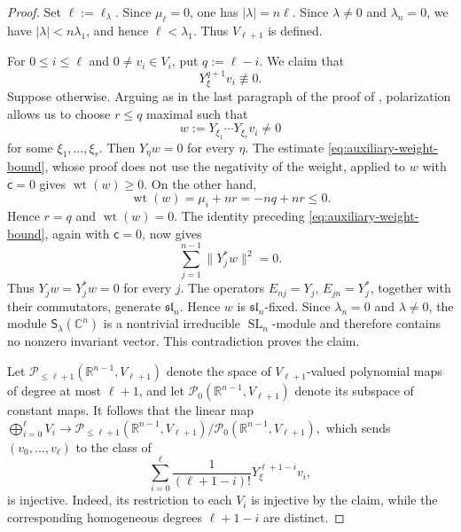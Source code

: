 \documentclass[reqno,11pt]{amsart}
\numberwithin{equation}{section}
\theoremstyle{definition}
\theoremstyle{remark}
\newcommand{\op}{\operatorname}
\newcommand{\SL}{\op{SL}}
\begin{document}
\begin{proof}
Set $\ell:=\ell_\lambda$. Since $\mu_\ell=0$, one has
$|\lambda|=n\ell$. Since $\lambda\ne0$ and $\lambda_n=0$, we have
$|\lambda|<n\lambda_1$, and hence $\ell<\lambda_1$. Thus
$V_{\ell+1}$ is defined.

For $0\le i\le\ell$ and $0\ne v_i\in V_i$, put $q:=\ell-i$. We claim that
$$
Y_\xi^{q+1}v_i\not\equiv0.
$$
Suppose otherwise. Arguing as in the last paragraph of the proof of
, polarization allows us to choose $r\le q$
maximal such that
$$
w:=Y_{\xi_1}\cdots Y_{\xi_r}v_i\ne0
$$
for some $\xi_1,\ldots,\xi_r$. Then $Y_\eta w=0$ for every $\eta$.
The estimate \eqref{eq:auxiliary-weight-bound}, whose proof does not use
the negativity of the weight, applied to $w$ with $\mathsf c=0$ gives
$\operatorname{wt}(w)\ge0$. On the other hand,
$$
\operatorname{wt}(w)
=
\mu_i+nr
=
-nq+nr
\le0.
$$
Hence $r=q$ and $\operatorname{wt}(w)=0$. The identity preceding
\eqref{eq:auxiliary-weight-bound}, again with $\mathsf c=0$, now gives
$$
\sum_{j=1}^{n-1}\|Y_j^*w\|^2=0.
$$
Thus $Y_jw=Y_j^*w=0$ for every $j$. The operators
$E_{nj}=Y_j$, $E_{jn}=Y_j^*$, together with their commutators, generate
$\mathfrak{sl}_n$. Hence $w$ is $\mathfrak{sl}_n$-fixed. Since
$\lambda_n=0$ and $\lambda\ne0$, the module
$\mathsf S_\lambda(\mathbb C^n)$ is a nontrivial irreducible
$\SL_n$-module and therefore contains no nonzero invariant vector.
This contradiction proves the claim.

Let
$\mathcal P_{\le\ell+1}(\mathbb R^{n-1},V_{\ell+1})$
denote the space of $V_{\ell+1}$-valued polynomial maps of degree at most
$\ell+1$, and let
$\mathcal P_0(\mathbb R^{n-1},V_{\ell+1})$
denote its subspace of constant maps. It follows that the linear map
$\bigoplus_{i=0}^{\ell}V_i
\to
\mathcal P_{\le\ell+1}(\mathbb R^{n-1},V_{\ell+1})/
\mathcal P_0(\mathbb R^{n-1},V_{\ell+1}),
$
which sends $(v_0,\ldots,v_\ell)$ to the class of
$$
\sum_{i=0}^{\ell}
\frac1{(\ell+1-i)!}Y_\xi^{\ell+1-i}v_i,
$$
is injective. Indeed, its restriction to each $V_i$ is injective by the
claim, while the corresponding homogeneous degrees $\ell+1-i$ are
distinct.


\end{proof}
\end{document}
